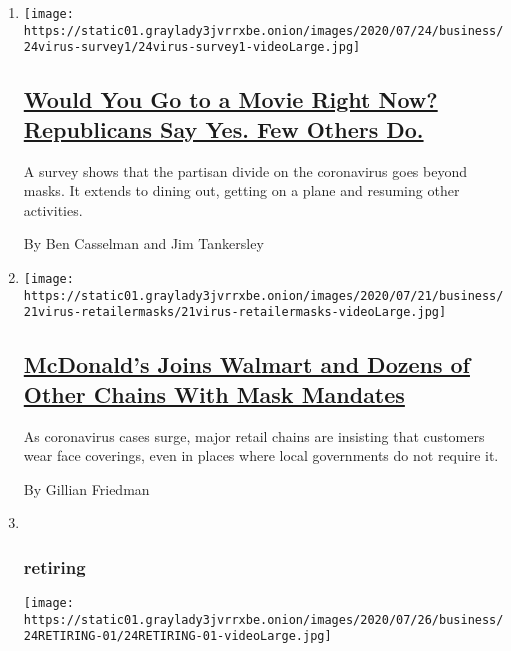 \begin{enumerate}
\def\labelenumi{\arabic{enumi}.}
\item
  \texttt{[image: https://static01.graylady3jvrrxbe.onion/images/2020/07/24/business/24virus-survey1/24virus-survey1-videoLarge.jpg]}

  \hypertarget{would-you-go-to-a-movie-right-now-republicans-say-yes-few-others-do}{%
  \subsection{\texorpdfstring{\href{/2020/07/24/business/economy/republicans-democrats-coronavirus-survey.html}{Would
  You Go to a Movie Right Now? Republicans Say Yes. Few Others
  Do.}}{Would You Go to a Movie Right Now? Republicans Say Yes. Few Others Do.}}\label{would-you-go-to-a-movie-right-now-republicans-say-yes-few-others-do}}

  A survey shows that the partisan divide on the coronavirus goes beyond
  masks. It extends to dining out, getting on a plane and resuming other
  activities.

  By Ben Casselman and Jim Tankersley
\item
  \texttt{[image: https://static01.graylady3jvrrxbe.onion/images/2020/07/21/business/21virus-retailermasks/21virus-retailermasks-videoLarge.jpg]}

  \hypertarget{mcdonalds-joins-walmart-and-dozens-of-other-chains-with-mask-mandates}{%
  \subsection{\texorpdfstring{\href{/article/which-stores-require-masks.html}{McDonald's
  Joins Walmart and Dozens of Other Chains With Mask
  Mandates}}{McDonald's Joins Walmart and Dozens of Other Chains With Mask Mandates}}\label{mcdonalds-joins-walmart-and-dozens-of-other-chains-with-mask-mandates}}

  As coronavirus cases surge, major retail chains are insisting that
  customers wear face coverings, even in places where local governments
  do not require it.

  By Gillian Friedman
\item ~
  \hypertarget{retiring}{%
  \subsubsection{retiring}\label{retiring}}

  \texttt{[image: https://static01.graylady3jvrrxbe.onion/images/2020/07/26/business/24RETIRING-01/24RETIRING-01-videoLarge.jpg]}


\end{enumerate}
